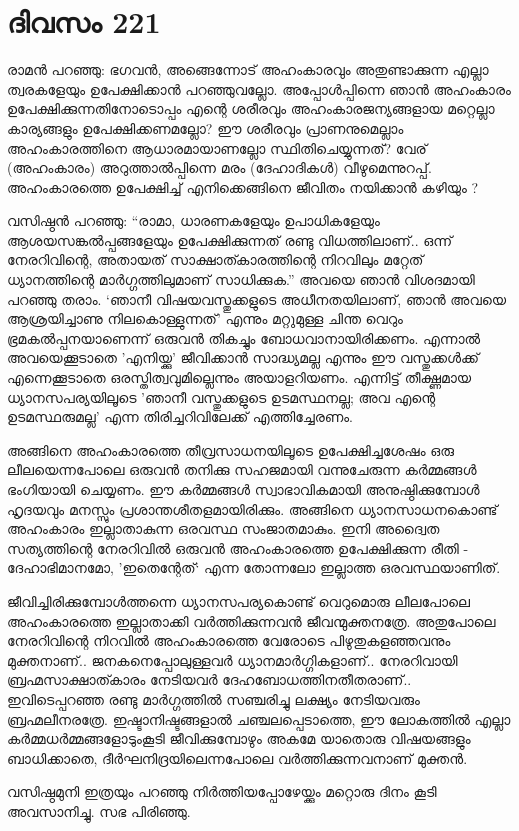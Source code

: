 \section{ദിവസം 221}


രാമൻ പറഞ്ഞു: ഭഗവൻ, അങ്ങെന്നോട് അഹംകാരവും  അതുണ്ടാക്കുന്ന എല്ലാ ത്വരകളേയും ഉപേക്ഷിക്കാൻ പറഞ്ഞുവല്ലോ. അപ്പോൾപ്പിന്നെ ഞാൻ അഹംകാരം ഉപേക്ഷിക്കുന്നതിനോടൊപ്പം എന്റെ ശരീരവും അഹംകാരജന്യങ്ങളായ മറ്റെല്ലാ കാര്യങ്ങളും ഉപേക്ഷിക്കണമല്ലോ? ഈ ശരീരവും പ്രാണനുമെല്ലാം അഹംകാരത്തിനെ ആധാരമായാണല്ലോ സ്ഥിതിചെയ്യുന്നത്? വേര്‌ (അഹംകാരം) അറുത്താൽപ്പിന്നെ മരം (ദേഹാദികൾ) വീഴുമെന്നുറപ്പ്. അഹംകാരത്തെ ഉപേക്ഷിച്ച് എനിക്കെങ്ങിനെ ജീവിതം നയിക്കാൻ കഴിയും ?

വസിഷ്ഠൻ പറഞ്ഞു: “രാമാ, ധാരണകളേയും ഉപാധികളേയും ആശയസങ്കൽപ്പങ്ങളേയും ഉപേക്ഷിക്കുന്നത് രണ്ടു വിധത്തിലാണ്‌.. ഒന്ന് നേരറിവിന്റെ, അതായത് സാക്ഷാത്കാരത്തിന്റെ നിറവിലും മറ്റേത് ധ്യാനത്തിന്റെ മാർഗ്ഗത്തിലുമാണ്‌ സാധിക്കുക.” അവയെ ഞാൻ വിശദമായി പറഞ്ഞു തരാം. ‘ഞാനീ വിഷയവസ്തുക്കളുടെ അധീനതയിലാണ്‌, ഞാൻ അവയെ ആശ്രയിച്ചാണു നിലകൊള്ളുന്നത്' എന്നും മറ്റുമുള്ള ചിന്ത  വെറും ഭ്രമകൽപ്പനയാണെന്ന് ഒരുവൻ തികച്ചും ബോധവാനായിരിക്കണം. എന്നാല്‍ അവയെക്കൂടാതെ 'എനിയ്ക്കു' ജീവിക്കാൻ സാദ്ധ്യമല്ല എന്നും ഈ വസ്തുക്കൾക്ക് എന്നെക്കൂടാതെ ഒരസ്തിത്വവുമില്ലെന്നും അയാളറിയണം. എന്നിട്ട് തീക്ഷ്ണമായ ധ്യാനസപര്യയിലൂടെ ’ഞാനീ വസ്തുക്കളുടെ ഉടമസ്ഥനല്ല; അവ എന്റെ ഉടമസ്ഥരുമല്ല' എന്ന തിരിച്ചറിവിലേക്ക് എത്തിച്ചേരണം.

അങ്ങിനെ അഹംകാരത്തെ തീവ്രസാധനയിലൂടെ ഉപേക്ഷിച്ചശേഷം ഒരു ലീലയെന്നപോലെ ഒരുവൻ തനിക്കു സഹജമായി വന്നുചേരുന്ന കർമ്മങ്ങൾ ഭംഗിയായി ചെയ്യണം. ഈ കർമ്മങ്ങൾ സ്വാഭാവികമായി അനുഷ്ഠിക്കുമ്പോൾ ഹൃദയവും മനസ്സും പ്രശാന്തശീതളമായിരിക്കും. അങ്ങിനെ ധ്യാനസാധനകൊണ്ട് അഹംകാരം ഇല്ലാതാകുന്ന ഒരവസ്ഥ സംജാതമാകും. ഇനി അദ്വൈത സത്യത്തിന്റെ നേരറിവിൽ ഒരുവൻ അഹംകാരത്തെ ഉപേക്ഷിക്കുന്ന രീതി - ദേഹാഭിമാനമോ, ’ഇതെന്റേത്‘ എന്ന തോന്നലോ ഇല്ലാത്ത ഒരവസ്ഥയാണിത്.

ജീവിച്ചിരിക്കുമ്പോൾത്തന്നെ ധ്യാനസപര്യകൊണ്ട് വെറുമൊരു ലീലപോലെ അഹംകാരത്തെ ഇല്ലാതാക്കി വർത്തിക്കുന്നവൻ ജീവന്മുക്തനത്രേ. അതുപോലെ നേരറിവിന്റെ നിറവിൽ അഹംകാരത്തെ വേരോടെ പിഴുതുകളഞ്ഞവനും മുക്തനാണ്‌.. ജനകനെപ്പോലുള്ളവർ ധ്യാനമാർഗ്ഗികളാണ്‌.. നേരറിവായി ബ്രഹ്മസാക്ഷാത്കാരം നേടിയവർ ദേഹബോധത്തിനതീതരാണ്‌.. ഇവിടെപ്പറഞ്ഞ രണ്ടു മാർഗ്ഗത്തിൽ സഞ്ചരിച്ചു ലക്ഷ്യം നേടിയവരും ബ്രഹ്മലീനരത്രേ. ഇഷ്ടാനിഷ്ടങ്ങളാൽ ചഞ്ചലപ്പെടാത്തെ, ഈ ലോകത്തിൽ എല്ലാ കർമ്മധർമ്മങ്ങളോടുംകൂടി ജീവിക്കുമ്പോഴും അകമേ യാതൊരു വിഷയങ്ങളും ബാധിക്കാതെ, ദീർഘനിദ്രയിലെന്നപോലെ വർത്തിക്കുന്നവനാണ്‌ മുക്തൻ.

വസിഷ്ഠമുനി ഇത്രയും പറഞ്ഞു നിർത്തിയപ്പോഴേയ്ക്കും മറ്റൊരു ദിനം കൂടി അവസാനിച്ചു. സഭ പിരിഞ്ഞു. 

